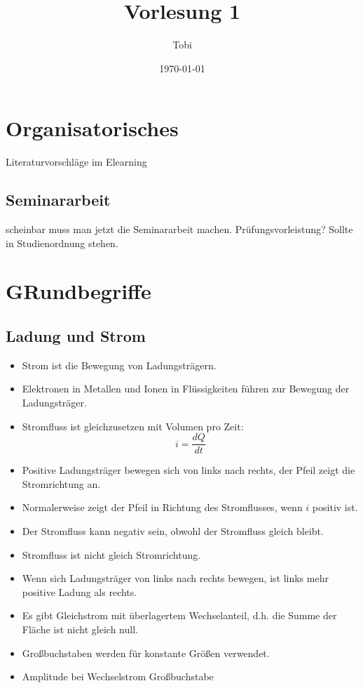 \documentclass[a4paper,12pt]{article}
\title{Vorlesung 1}
\author{Tobi}
\date{\today}
\begin{document}
\maketitle

\section{Organisatorisches}

Literaturvorschläge im Elearning

\subsection*{Seminararbeit}

scheinbar muss man jetzt die Seminararbeit machen.
Prüfungsvorleistung? Sollte in Studienordnung stehen.

\section{GRundbegriffe}

\subsection*{Ladung und Strom}

\begin{itemize}
    \item Strom ist die Bewegung von Ladungsträgern.
    \item Elektronen in Metallen und Ionen in Flüssigkeiten führen zur Bewegung der Ladungsträger.
    \item Stromfluss ist gleichzusetzen mit Volumen pro Zeit: 
    \[
    i = \frac{dQ}{dt}
    \]
\end{itemize}

\begin{itemize}
    \item Positive Ladungsträger bewegen sich von links nach rechts, der Pfeil zeigt die Stromrichtung an.
    \item Normalerweise zeigt der Pfeil in Richtung des Stromflusses, wenn $i$ positiv ist.
    \item Der Stromfluss kann negativ sein, obwohl der Stromfluss gleich bleibt.
    \item Stromfluss ist nicht gleich Stromrichtung.
    \item Wenn sich Ladungsträger von links nach rechts bewegen, ist links mehr positive Ladung als rechts.
    \item Es gibt Gleichstrom mit überlagertem Wechselanteil, d.h. die Summe der Fläche ist nicht gleich null.
    \item Großbuchstaben werden für konstante Größen verwendet.
    \item Amplitude bei Wechselstrom Großbuchstabe
\end{itemize}
\end{document}
